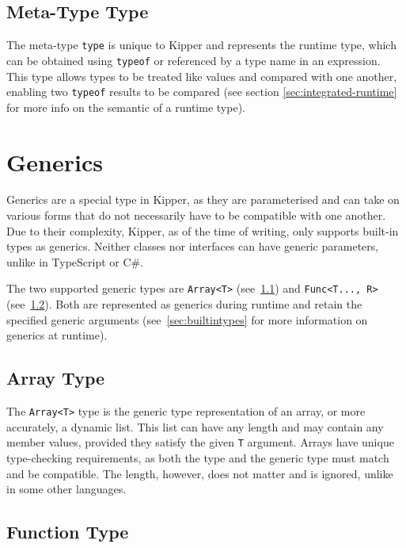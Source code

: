 \subsection{Meta-Type Type}

The meta-type \lstinline|type| is unique to Kipper and represents the runtime type, which can be obtained using \lstinline|typeof| or referenced by a type name in an expression. This type allows types to be treated like values and compared with one another, enabling two \lstinline|typeof| results to be compared (see section \ref{sec:integrated-runtime} for more info on the semantic of a runtime type).

\section{Generics}
\label{sec:kipper-generics}

Generics are a special type in Kipper, as they are parameterised and can take on various forms that do not necessarily have to be compatible with one another. Due to their complexity, Kipper, as of the time of writing, only supports built-in types as generics. Neither classes nor interfaces can have generic parameters, unlike in TypeScript or C\#.

The two supported generic types are \lstinline|Array<T>| (see~\ref{sec:array-type}) and \lstinline|Func<T..., R>| (see~\ref{sec:func-type}). Both are represented as generics during runtime and retain the specified generic arguments (see~\ref{sec:builtintypes} for more information on generics at runtime).

\subsection{Array Type}
\label{sec:array-type}

The \lstinline|Array<T>| type is the generic type representation of an array, or more accurately, a dynamic list. This list can have any length and may contain any member values, provided they satisfy the given \lstinline|T| argument. Arrays have unique type-checking requirements, as both the type and the generic type must match and be compatible. The length, however, does not matter and is ignored, unlike in some other languages.

\subsection{Function Type}
\label{sec:func-type}

